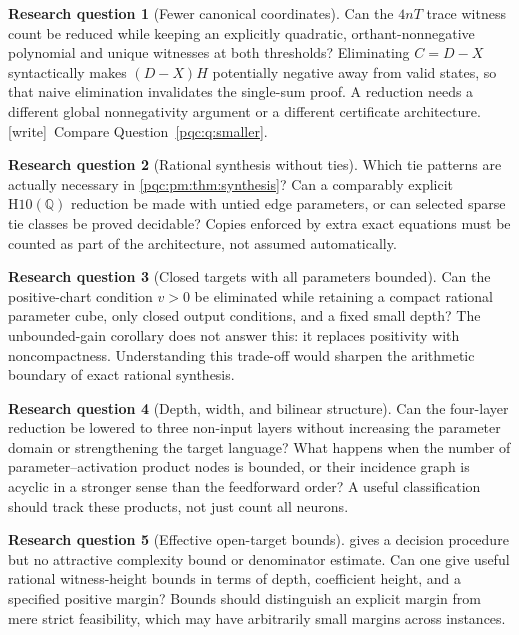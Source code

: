 \documentclass[11pt,letterpaper]{article}
\numberwithin{equation}{section}
\theoremstyle{definition}
\newtheorem{question}{Research question}
\theoremstyle{remark}
\newcommand{\Q}{\mathbb Q}
\newcommand{\wtag}{\textup{[write]}}
\newcommand{\Hten}{\mathrm{H10}(\Q)}
\begin{document}
\begin{question}[Fewer canonical coordinates]
Can the $4nT$ trace witness count be reduced while keeping an explicitly
quadratic, orthant-nonnegative polynomial and unique witnesses at both
thresholds? Eliminating $C=D-X$ syntactically makes $(D-X)H$ potentially
negative away from valid states, so that naive elimination invalidates the
single-sum proof. A reduction needs a different global nonnegativity
argument or a different certificate architecture.
\wtag\ Compare Question~\ref{pqc:q:smaller}.
\end{question}

\begin{question}[Rational synthesis without ties]
Which tie patterns are actually necessary in \cref{pqc:pm:thm:synthesis}? Can a
comparably explicit $\Hten$ reduction be made with untied edge parameters,
or can selected sparse tie classes be proved decidable? Copies enforced by
extra exact equations must be counted as part of the architecture, not
assumed automatically.
\end{question}

\begin{question}[Closed targets with all parameters bounded]
Can the positive-chart condition $v>0$ be eliminated while retaining a
compact rational parameter cube, only closed output conditions, and a
fixed small depth? The unbounded-gain corollary does not answer this:
it replaces positivity with noncompactness. Understanding this trade-off
would sharpen the arithmetic boundary of exact rational synthesis.
\end{question}

\begin{question}[Depth, width, and bilinear structure]
Can the four-layer reduction be lowered to three non-input layers without
increasing the parameter domain or strengthening the target language?
What happens when the number of parameter--activation product nodes is
bounded, or their incidence graph is acyclic in a stronger sense than the
feedforward order? A useful classification should track these products,
not just count all neurons.
\end{question}

\begin{question}[Effective open-target bounds]
 gives a decision procedure but no attractive complexity
bound or denominator estimate. Can one give useful rational witness-height
bounds in terms of depth, coefficient height, and a specified positive
margin? Bounds should distinguish an explicit margin from mere strict
feasibility, which may have arbitrarily small margins across instances.
\end{question}
\end{document}
